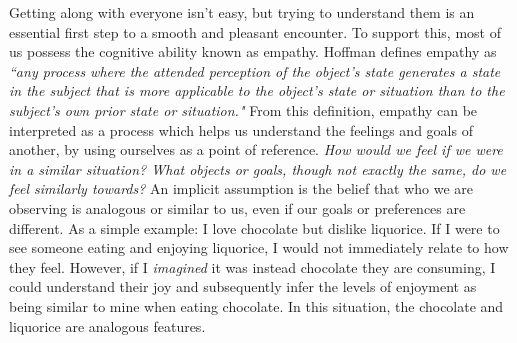 Getting along with everyone isn't easy, but trying to understand them is an essential first step to a smooth and pleasant encounter. 
To support this, most of us possess the cognitive ability known as empathy. Hoffman \cite{hoffman1996empathy} defines empathy as \textit{``any process where the attended perception of the object’s state generates a state in the subject that is more applicable to the object’s state or situation than to the subject’s own prior state or situation."} From this definition, empathy can be interpreted as a process which helps us understand the feelings and goals of another, by using ourselves as a point of reference. \textit{How would we feel if we were in a similar situation? What objects or goals, though not exactly the same, do we feel similarly towards?} An implicit assumption is the belief that who we are observing is analogous or similar to us, even if our goals or preferences are different. %
As a simple example: I love chocolate but dislike liquorice. If I were to see someone eating and enjoying liquorice, I would not immediately relate to how they feel. However, if I \textit{imagined} it was instead chocolate they are consuming, I could understand their joy and subsequently infer the levels of enjoyment as being similar to mine when eating chocolate. In this situation, the chocolate and liquorice are analogous features.

